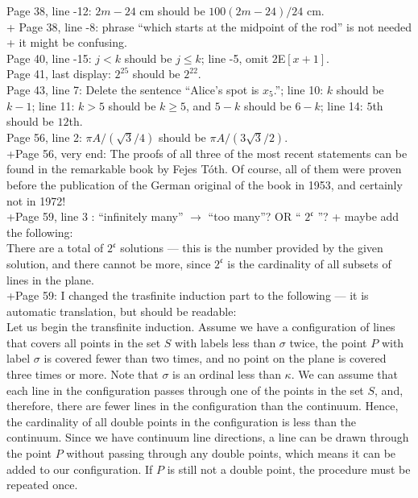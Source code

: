 \documentclass[11pt]{article}
\begin{document}
Page 38, line -12: $2m-24$ cm should be $100(2m-24)/24$ cm.\\

+ Page 38, line -8: phrase ``which starts at the midpoint of the rod'' is not needed + it might be confusing.\\

Page 40, line -15: $j < k$ should be $j \le k$; line -5, omit 2E$[x+1]$.\\

Page 41, last display: $2^{25}$ should be $2^{22}$.\\

Page 43, line 7: Delete the sentence ``Alice's spot is $x_5$.'';
line 10: $k$ should be $k{-}1$;
line 11: $k>5$ should be $k\ge 5$, and $5{-}k$ should be $6{-}k$;
line 14: $5$th should be $12$th.\\

Page 56, line 2: $\pi A/(\sqrt{3}/4)$ should be $\pi A/(3\sqrt{3}/2)$.\\

+Page 56, very end: The proofs of all three of the most recent statements can be found in the remarkable book by Fejes Tóth. Of course, all of them were proven before the publication of the German original of the book in 1953, and certainly not in 1972!\\

+Page 59, line 3 : ``infinitely many'' $\to$ ``too many''? OR `` $2^{\mathfrak{c}}$ ''? + maybe add the following:\\

There are a total of \( 2^{\mathfrak{c}} \) solutions — this is the number provided by the given solution, and there cannot be more, since \( 2^{\mathfrak{c}} \) is the cardinality of all subsets of lines in the plane.\\

+Page 59: I changed the trasfinite induction part to the following --- it is automatic translation, but should be readable:\\

Let us begin the transfinite induction.
Assume we have a configuration of lines that covers all points in the set \( S \) with labels less than \( \sigma \) twice,
the point \( P \) with label \( \sigma \) is covered fewer than two times,
and no point on the plane is covered three times or more.
Note that \( \sigma \) is an ordinal less than \( \kappa \).
We can assume that each line in the configuration passes through one of the points in the set \( S \),
and, therefore, there are fewer lines in the configuration than the continuum.
Hence, the cardinality of all double points in the configuration is less than the continuum.
Since we have continuum line directions, a line can be drawn through the point \( P \) without passing through any double points,
which means it can be added to our configuration.
If \( P \) is still not a double point, the procedure must be repeated once.\\
\end{document}

